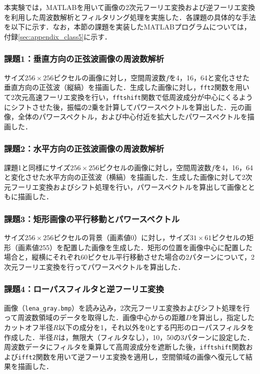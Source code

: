 \documentclass[paper=a4, fontsize=10pt]{jlreq}
\begin{document}
本実験では，MATLABを用いて画像の2次元フーリエ変換および逆フーリエ変換を利用した周波数解析とフィルタリング処理を実施した．各課題の具体的な手法を以下に示す．なお，本節の課題を実装したMATLABプログラムについては，付録\ref{sec:appendix_class5}に示す．

\subsubsection{課題1：垂直方向の正弦波画像の周波数解析}
サイズ$256 \times 256$ピクセルの画像に対し，空間周波数$f$を4，16，64と変化させた垂直方向の正弦波（縦縞）を描画した．生成した画像に対し，\texttt{fft2}関数を用いて2次元高速フーリエ変換を行い，\texttt{fftshift}関数で低周波成分が中心にくるようにシフトさせた後，振幅の2乗を計算してパワースペクトルを算出した．元の画像，全体のパワースペクトル，および中心付近を拡大したパワースペクトルを描画した．

\subsubsection{課題2：水平方向の正弦波画像の周波数解析}
課題1と同様にサイズ$256 \times 256$ピクセルの画像に対し，空間周波数$f$を4，16，64と変化させた水平方向の正弦波（横縞）を描画した．生成した画像に対して2次元フーリエ変換およびシフト処理を行い，パワースペクトルを算出して画像とともに描画した．

\subsubsection{課題3：矩形画像の平行移動とパワースペクトル}
サイズ$256 \times 256$ピクセルの背景（画素値0）に対し，サイズ$31 \times 61$ピクセルの矩形（画素値255）を配置した画像を生成した．矩形の位置を画像中心に配置した場合と，縦横にそれぞれ60ピクセル平行移動させた場合の2パターンについて，2次元フーリエ変換を行ってパワースペクトルを算出した．

\subsubsection{課題4：ローパスフィルタと逆フーリエ変換}
画像（\texttt{lena\_gray.bmp}）を読み込み，2次元フーリエ変換およびシフト処理を行って周波数領域のデータを取得した．画像中心からの距離$D$を算出し，指定したカットオフ半径$R$以下の成分を1，それ以外を0とする円形のローパスフィルタを作成した．半径$R$は，無限大（フィルタなし），10，50の3パターンに設定した．周波数データにフィルタを乗算して高周波成分を遮断した後，\texttt{ifftshift}関数および\texttt{ifft2}関数を用いて逆フーリエ変換を適用し，空間領域の画像へ復元して結果を描画した．
\end{document}
